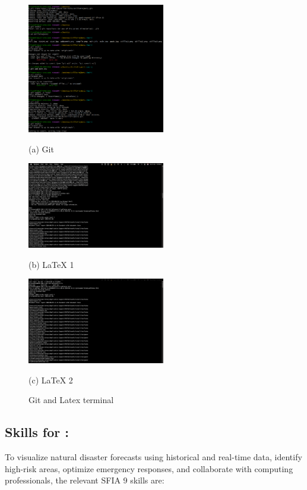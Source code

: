 \documentclass[a4paper, 11pt]{report}
\begin{document}
\begin{figure}[htbp]
\centering

\begin{minipage}[t]{0.32\textwidth}
\centering
\includegraphics[width=6cm]{HiltonGit.png}
\caption*{(a) Git}
\end{minipage}%
\hfill
\begin{minipage}[t]{0.32\textwidth}
\centering
\includegraphics[width=6cm]{latexHilton1.png}
\caption*{(b) LaTeX 1}
\end{minipage}%
\hfill
\begin{minipage}[t]{0.32\textwidth}
\centering
\includegraphics[width=6cm]{latexHilton2.png}
\caption*{(c) LaTeX 2}
\end{minipage}

\caption{Git and Latex terminal}
\end{figure}



\subsection{Skills for \majB: \studB}

To visualize natural disaster forecasts using historical and real-time data, identify high-risk areas, optimize emergency responses, and collaborate with computing professionals, the relevant SFIA 9 skills are:
\end{document}
